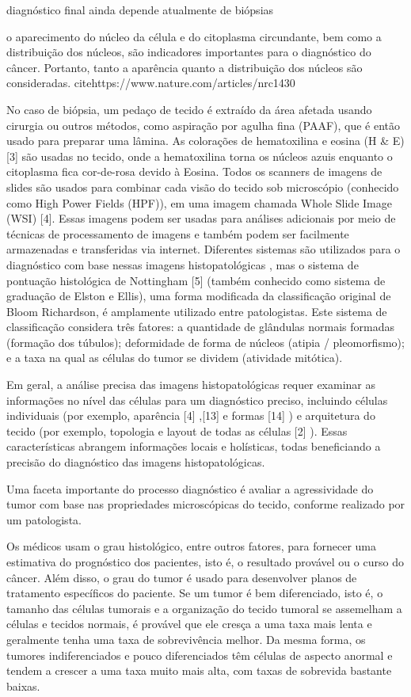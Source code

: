 \documentclass[preprint,12pt,authoryear]{elsarticle}
\begin{document}
  \cite{ZHENG2017} diagnóstico final ainda depende atualmente de biópsias
  
  o aparecimento do núcleo da célula e do citoplasma circundante, bem como a distribuição dos núcleos, são indicadores importantes para o diagnóstico do câncer. Portanto, tanto a aparência quanto a distribuição dos núcleos são consideradas. cite{https://www.nature.com/articles/nrc1430}
  
  No caso de biópsia, um pedaço de tecido é extraído da área afetada usando cirurgia ou outros métodos, como aspiração por agulha fina (PAAF), que é então usado para preparar uma lâmina. As colorações de hematoxilina e eosina (H & E) [3] são usadas no tecido, onde a hematoxilina torna os núcleos azuis enquanto o citoplasma fica cor-de-rosa devido à Eosina. Todos os scanners de imagens de slides são usados ​​para combinar cada visão do tecido sob microscópio (conhecido como High Power Fields (HPF)), em uma imagem chamada Whole Slide Image (WSI) [4]. Essas imagens podem ser usadas para análises adicionais por meio de técnicas de processamento de imagens e também podem ser facilmente armazenadas e transferidas via internet. Diferentes sistemas são utilizados para o diagnóstico com base nessas imagens histopatológicas , mas o sistema de pontuação histológica de Nottingham [5] (também conhecido como sistema de graduação de Elston e Ellis), uma forma modificada da classificação original de Bloom Richardson, é amplamente utilizado entre patologistas. Este sistema de classificação considera três fatores: a quantidade de glândulas normais formadas (formação dos túbulos); deformidade de forma de núcleos (atipia / pleomorfismo); e a taxa na qual as células do tumor se dividem (atividade mitótica). \cite{WAHAB2017}
  
  Em geral, a análise precisa das imagens histopatológicas requer examinar as informações no nível das células para um diagnóstico preciso, incluindo células individuais (por exemplo, aparência [4] ,[13] e formas  [14] ) e arquitetura do tecido (por exemplo, topologia e layout de todas as células  [2] ). Essas características abrangem informações locais e holísticas, todas beneficiando a precisão do diagnóstico das imagens histopatológicas. \cite{ZHANG2016}
  
  Uma faceta importante do processo diagnóstico é avaliar a agressividade do tumor com base nas propriedades microscópicas do tecido, conforme realizado por um patologista.
  
  Os médicos usam o grau histológico, entre outros fatores, para fornecer uma estimativa do prognóstico dos pacientes, isto é, o resultado provável ou o curso do câncer. Além disso, o grau do tumor é usado para desenvolver planos de tratamento específicos do paciente. Se um tumor é bem diferenciado, isto é, o tamanho das células tumorais e a organização do tecido tumoral se assemelham a células e tecidos normais, é provável que ele cresça a uma taxa mais lenta e geralmente tenha uma taxa de sobrevivência melhor. Da mesma forma, os tumores indiferenciados e pouco diferenciados têm células de aspecto anormal e tendem a crescer a uma taxa muito mais alta, com taxas de sobrevida bastante baixas. \cite{KHAN2015}
  
\end{document}
